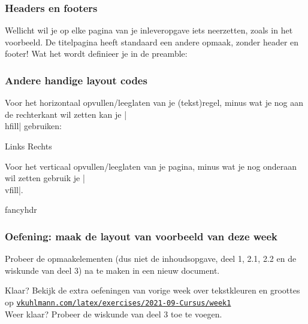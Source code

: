 \documentclass{cursuspresentatie}
\begin{document}
\begin{frame}
	\frametitle{Headers en footers}
	Wellicht wil je op elke pagina van je inleveropgave iets neerzetten, zoals
	in het voorbeeld. De titelpagina heeft standaard een andere opmaak, zonder
	header en footer! Wat het wordt definieer je in de preamble:

\end{frame}

\begin{frame}
	\frametitle{Andere handige layout codes}
	Voor het horizontaal opvullen/leeglaten van je (tekst)regel, minus wat je
	nog aan de rechterkant wil zetten kan je \hll|\\hfill|
	gebruiken:

	Links \hfill Rechts
	
	Voor het verticaal opvullen/leeglaten van je pagina, \vfill minus wat je nog
	onderaan wil zetten gebruik je \hll|\\vfill|.
\end{frame}

\begin{saveblock}{fancyhdr}
    \begin{highlightblock}
        \usepackage{fancyhdr,lastpage}
        \pagestyle{fancy}
        \fancyhf{}
    \end{highlightblock}
\end{saveblock}

\begin{frame}
	\frametitle{Oefening: maak de layout van voorbeeld van deze week}
	Probeer de opmaakelementen (dus niet de inhoudsopgave, deel 1, 2.1,  2.2 en de wiskunde van deel 3) na te maken in een nieuw document.
    
    
	Klaar? Bekijk de extra oefeningen van vorige week over tekstkleuren en
	groottes op
	\href{https://vkuhlmann.com/latex/exercises/2021-09-Cursus/week1}{\nolinkurl{vkuhlmann.com/latex/exercises/2021-09-Cursus/week1}}\\
	Weer klaar? Probeer de wiskunde van deel 3 toe te voegen.
	
\end{frame}
\end{document}
